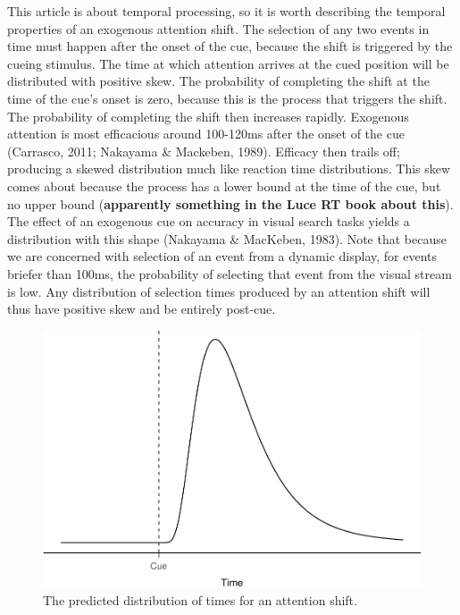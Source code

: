 \documentclass[,man,floatsintext]{apa6}
\theoremstyle{definition}
\theoremstyle{definition}
\theoremstyle{definition}
\theoremstyle{remark}
\begin{document}
This article is about temporal processing, so it is worth describing the
temporal properties of an exogenous attention shift. The selection of
any two events in time must happen after the onset of the cue, because
the shift is triggered by the cueing stimulus. The time at which
attention arrives at the cued position will be distributed with positive
skew. The probability of completing the shift at the time of the cue's
onset is zero, because this is the process that triggers the shift. The
probability of completing the shift then increases rapidly. Exogenous
attention is most efficacious around 100-120ms after the onset of the
cue (Carrasco, 2011; Nakayama \& Mackeben, 1989). Efficacy then trails
off; producing a skewed distribution much like reaction time
distributions. This skew comes about because the process has a lower
bound at the time of the cue, but no upper bound (\textbf{apparently
something in the Luce RT book about this}). The effect of an exogenous
cue on accuracy in visual search tasks yields a distribution with this
shape (Nakayama \& MacKeben, 1983). Note that because we are concerned
with selection of an event from a dynamic display, for events briefer
than 100ms, the probability of selecting that event from the visual
stream is low. Any distribution of selection times produced by an
attention shift will thus have positive skew and be entirely post-cue.

\begin{figure}
\centering
\includegraphics{Intro_for_Alex_files/figure-latex/attentionShift-1.pdf}
\caption{\label{fig:attentionShift}\label{attentionShift:figs}The predicted
distribution of times for an attention shift.}
\end{figure}
\end{document}
